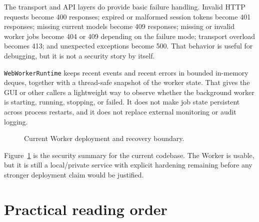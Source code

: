 The transport and API layers do provide basic failure handling. Invalid HTTP requests become 400 responses; expired or malformed session tokens become 401 responses; missing current models become 409 responses; missing or invalid worker jobs become 404 or 409 depending on the failure mode; transport overload becomes 413; and unexpected exceptions become 500. That behavior is useful for debugging, but it is not a security story by itself.

\texttt{WebWorkerRuntime} keeps recent events and recent errors in bounded in-memory deques, together with a thread-safe snapshot of the worker state. That gives the GUI or other callers a lightweight way to observe whether the background worker is starting, running, stopping, or failed. It does not make job state persistent across process restarts, and it does not replace external monitoring or audit logging.

\begin{figure}[htbp]
\centering
\caption{Current Worker deployment and recovery boundary.}
\label{fig:worker-architecture-security-boundary}
\end{figure}

Figure~\ref{fig:worker-architecture-security-boundary} is the security summary for the current codebase. The Worker is usable, but it is still a local/private service with explicit hardening remaining before any stronger deployment claim would be justified.

\section{Practical reading order}
\label{sec:worker-architecture-reading-order}

